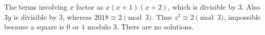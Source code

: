The terms involving $x$ factor as $x(x+1)(x+2)$, which is divisible by $3$. Also $3y$ is divisible by $3$, whereas $2018\equiv2\pmod3$. Thus $z^2\equiv2\pmod3$, impossible because a square is $0$ or $1$ modulo $3$. There are $\boxed{\text{no solutions}}$.
